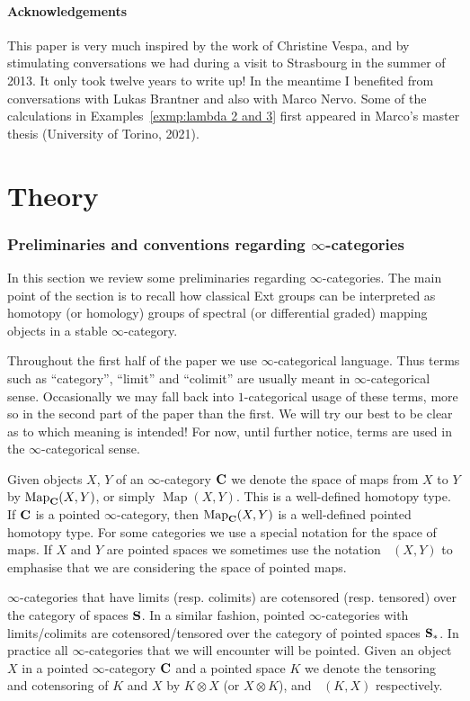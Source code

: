 \documentclass[psamsfonts]{amsart}
\theoremstyle{plain}
\theoremstyle{definition}
\theoremstyle{remark}
\newcommand{\catname}[1]{{\normalfont\textbf{#1}}}
\newcommand{\spaces}{\catname{S}_*}
\newcommand{\unpointed}{\catname{S}}
\DeclareMathOperator{\map}{Map}
\DeclareMathOperator{\pointedmaps}{\map_*}
\begin{document}
\subsection*{Acknowledgements} This paper is very much inspired by the work of Christine Vespa, and by  stimulating conversations we had during a visit to Strasbourg in the summer of 2013. It only took twelve years to write up! In the meantime I benefited from conversations with Lukas Brantner and also with Marco Nervo. Some of the calculations in Examples~\ref{exmp:lambda 2 and 3} first appeared in Marco's master thesis (University of Torino, 2021).



\part{Theory}

\section{Preliminaries and conventions regarding $\infty$-categories}\label{section:preliminaries}
In this section we review some preliminaries regarding $\infty$-categories. The main point of the section is to recall how classical Ext groups can be interpreted as homotopy (or homology) groups of spectral (or differential graded) mapping objects in a stable $\infty$-category.

Throughout the first half of the paper we use $\infty$-categorical language. Thus terms such as ``category'', ``limit'' and ``colimit'' are usually meant in $\infty$-categorical sense. Occasionally we may fall back into $1$-categorical usage of these terms, more so in the second part of the paper than the first. We will try our best to be clear as to which meaning is intended! For now, until further notice, terms are used in the $\infty$-categorical sense.

Given objects $X$, $Y$ of an $\infty$-category $\catname{C}$ we denote the space of maps from $X$ to $Y$ by $\map_{\catname{C}}(X, Y)$, or simply $\map(X, Y)$. This is a well-defined homotopy type. If $\catname{C}$ is a pointed $\infty$-category, then $\map_{\catname{C}}(X, Y)$ is a well-defined pointed homotopy type. For some categories we use a special notation for the space of maps. If $X$ and $Y$ are pointed spaces we sometimes use the notation $\pointedmaps(X, Y)$ to emphasise that we are considering the space of pointed maps. 

$\infty$-categories that have limits (resp. colimits) are cotensored (resp. tensored) over the category of spaces $\unpointed$. In a similar fashion, pointed $\infty$-categories with limits/colimits are cotensored/tensored over the category of pointed spaces $\spaces$. In practice all $\infty$-categories that we will encounter will be pointed. Given an object $X$ in a pointed $\infty$-category $\catname{C}$ and a pointed space $K$ we denote the tensoring and cotensoring of $K$ and $X$ by $K\otimes X$ (or $X\otimes K$), and $\pointedmaps(K, X)$ respectively. 
\end{document}
